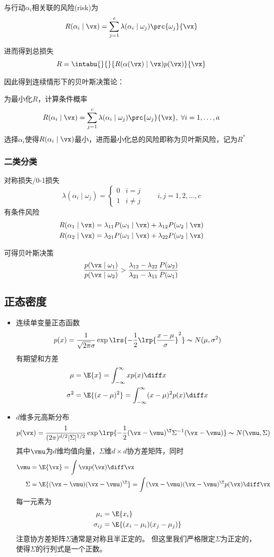 与行动$\alpha_i$相关联的风险(risk)为
\[R(\alpha_i\mid\vx)=\sum_{j=1}^c\lambda(\alpha_i\mid\omega_j)\prc{\omega_j}{\vx}\]

进而得到总损失
\[R=\intabu{}{}{R(\alpha(\vx)\mid\vx)p(\vx)}{\vx}\]

因此得到连续情形下的贝叶斯决策论：
\begin{theorem}
为最小化$R$，计算条件概率
\[R(\alpha_i\mid\vx)=\sum_{j=1}^c\lambda(\alpha_i\mid\omega_j)\prc{\omega_j}{\vx},\;\forall i=1,\ldots,a\]
选择$\alpha_i$使得$R(\alpha_i\mid\vx)$最小，进而最小化总的风险即称为贝叶斯风险，记为$R^*$
\end{theorem}

\subsubsection{二类分类}
对称损失/0-1损失
\[\lambda(\alpha_i\mid\omega_j)=
\begin{cases}
0 & i=j\\
1 & i\ne j
\end{cases}
\qquad i,j=1,2,\ldots,c\]
有条件风险
\[\begin{aligned}
R(\alpha_1\mid\vx)&=\lambda_{11}P(\omega_1\mid\vx)+\lambda_{12}P(\omega_2\mid\vx)\\
R(\alpha_2\mid\vx)&=\lambda_{21}P(\omega_1\mid\vx)+\lambda_{22}P(\omega_2\mid\vx)
\end{aligned}\]

可得贝叶斯决策
\[\frac{p(\vx\mid\omega_1)}{p(\vx\mid\omega_2)}>\frac{\lambda_{12}-\lambda_{22}}{\lambda_{21}-\lambda_{11}}\frac{P(\omega_2)}{P(\omega_1)}\]

\subsection{正态密度}
\begin{itemize}
	\item 连续单变量正态函数
\[p(x)=\frac{1}{\sqrt{2\pi}\sigma}\exp\lrs{-\frac{1}{2}\lrp{\frac{x-\mu}{\sigma}}^2}\thicksim N(\mu,\sigma^2)\]
有期望和方差
\[\begin{aligned}
\mu &= \E{x}=\int_{-\infty}^\infty xp(x)\diff x\\
\sigma^2 &=\E{(x-\mu)^2}=\int_{-\infty}^\infty (x-\mu)^2 p(x)\diff x
\end{aligned}\]

	\item $d$维多元高斯分布
\[p(\vx)=\frac{1}{(2\pi)^{d/2}|\Sigma|^{1/2}}\exp\lrp{-\frac{1}{2}(\vx-\vmu)^\T\Sigma^{-1}(\vx-\vmu)}\thicksim N(\vmu,\Sigma)\]
其中$\vmu$为$d$维均值向量，$\Sigma$维$d\times d$协方差矩阵，同时
\[\begin{aligned}
\vmu &=\E{\vx} = \int\vx p(\vx)\diff\vx\\
\Sigma &=\E{(\vx-\vmu)(\vx-\vmu)^\T} = \int(\vx-\vmu)(\vx-\vmu)^\T p(\vx)\diff\vx
\end{aligned}\]
每一元素为
\[\begin{aligned}
\mu_i &= \E{x_i}\\
\sigma_{ij} &= \E{(x_i-\mu_i)(x_j-\mu_j)}
\end{aligned}\]
注意协方差矩阵$\Sigma$通常是对称且半正定的。
但这里我们严格限定$\Sigma$为正定的，使得$\Sigma$的行列式是一个正数。
\end{itemize}

